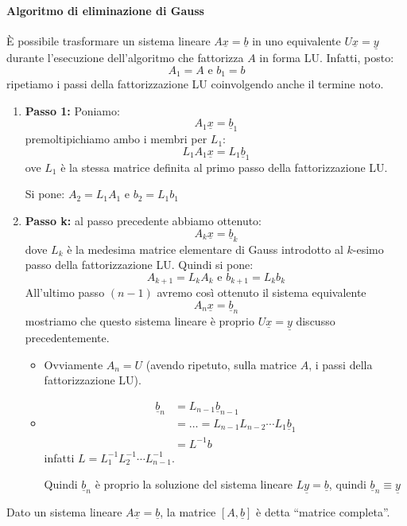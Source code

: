 \documentclass[12pt]{report}
\begin{document}
\paragraph{Algoritmo di eliminazione di Gauss} È possibile trasformare un sistema lineare $A\underline{x} = \underline{b}$ in uno equivalente $U\underline{x} = \underline{y}$ durante l'esecuzione dell'algoritmo che fattorizza $A$ in forma LU. Infatti, posto:
\[
A_1 = A \text{ e } b_1 = b
\]
ripetiamo i passi della fattorizzazione LU coinvolgendo anche il termine noto.
\begin{enumerate}
	\item \textbf{Passo 1:} Poniamo:
	\[
	A_1 \underline{x} = \underline{b}_1
	\]
	premoltipichiamo ambo i membri per $L_1$:
	\[
	L_1A_1\underline{x} = L_1\underline{b}_1
	\]
	ove $L_1$ è la stessa matrice definita al primo passo della fattorizzazione LU.

	Si pone: $A_2 = L_1A_1$ e $b_2=L_1b_1$
	\item \textbf{Passo k:} al passo precedente abbiamo ottenuto:
	\[
	A_k\underline{x} = \underline{b}_k
	\]
	dove $L_k$ è la medesima matrice elementare di Gauss introdotto al $k$-esimo passo della fattorizzazione LU. Quindi si pone:
	\[
	A_{k+1} = L_kA_k \text{ e } b_{k+1}=L_kb_k
	\]
	All'ultimo passo $(n-1)$ avremo così ottenuto il sistema equivalente
	\[
	A_n\underline{x} = \underline{b}_n
	\]
	mostriamo che questo sistema lineare è proprio $U\underline{x} = \underline{y}$ discusso precedentemente.
	\begin{itemize}
		\item Ovviamente $A_n = U$ (avendo ripetuto, sulla matrice $A$, i passi della fattorizzazione LU).
		\item \begin{align*}
			\underline{b}_n &= L_{n-1}\underline{b}_{n-1} \\
			&= \dots = L_{n-1}L_{n-2}\cdots L_1\underline{b}_1 \\
			&= L^{-1}b
		\end{align*}
		infatti $L = L_1^{-1}L_2^{-1}\cdots L_{n-1}^{-1}$.

		Quindi $\underline{b}_n$ è proprio la soluzione del sistema lineare $L\underline{y} = \underline{b}$, quindi $\underline{b}_n \equiv \underline{y}$
	\end{itemize}
\end{enumerate}
Dato un sistema lineare $A\underline{x} = \underline{b}$, la matrice $[A, \underline{b}]$ è detta ``matrice completa''.
\end{document}
